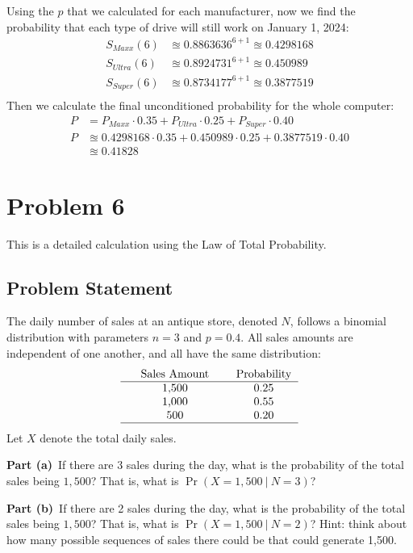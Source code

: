 \documentclass[12pt]{article}
\theoremstyle{definition}
\begin{document}
Using the $p$ that we calculated for each manufacturer, now we find the probability that each type of drive will still work on January 1, 2024:
\begin{align*}
S_{Maxx}(6) &\approxeq 0.8863636^{6 + 1} \approxeq 0.4298168\\
S_{Ultra}(6) &\approxeq 0.8924731^{6 + 1} \approxeq 0.450989\\
S_{Super}(6) &\approxeq 0.8734177^{6 + 1} \approxeq 0.3877519\\
\end{align*}
Then we calculate the final unconditioned probability for the whole computer:
\begin{align*}
P &= P_{Maxx}\cdot 0.35 + P_{Ultra}\cdot 0.25 + P_{Super}\cdot 0.40\\
P &\approxeq 0.4298168 \cdot 0.35 + 0.450989 \cdot 0.25 + 0.3877519 \cdot 0.40\\
  &\approxeq 0.41828
\end{align*}

\newpage
\section*{Problem 6}

This is a detailed calculation using the Law of Total Probability.

\subsection*{Problem Statement}

The daily number of sales at an antique store, denoted $N$, follows a binomial distribution with parameters $n = 3$ and $p = 0.4$. All sales amounts are independent of one another, and all have the same distribution:
$$
\begin{tabular}{ccccc}
& Sales Amount & & Probability\\
\hline
& 1,500 & & 0.25\\
& 1,000 & & 0.55\\
& 500 & & 0.20\\
\hline
\end{tabular}
$$
Let $X$ denote the total daily sales.

\bigskip
\noindent
{\bf Part (a)}\ If there are 3 sales during the day, what is the probability of the total sales being $1,500$? That is, what is $\Pr(X = 1,500\ |\ N = 3)$?

\bigskip
\noindent
{\bf Part (b)}\ If there are 2 sales during the day, what is the probability of the total sales being $1,500$? That is, what is $\Pr(X = 1,500\ |\ N = 2)$? Hint: think about how many possible sequences of sales there could be that could generate 1,500.
\end{document}
